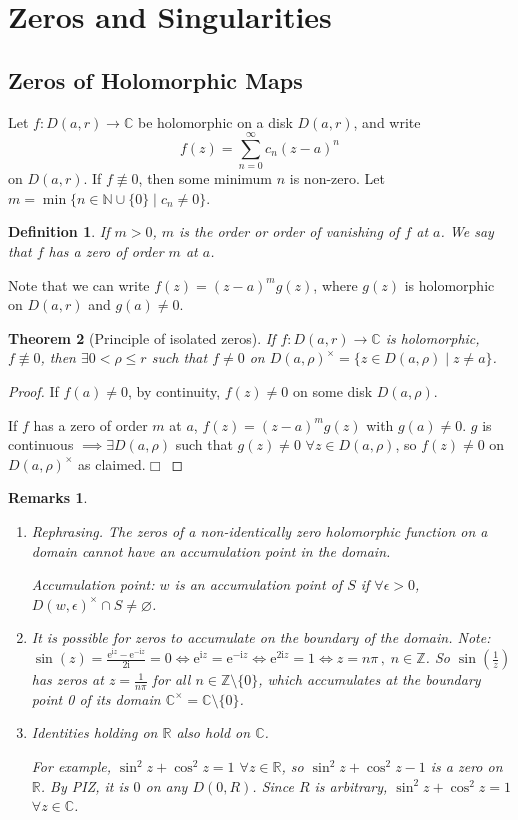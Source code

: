 \documentclass{article}
\theoremstyle{plain}\theoremheaderfont{\normalfont\itshape}\theorembodyfont{\rmfamily}\theoremseparator{.}\newtheorem*{rem}{Remark}\newtheorem*{ex}{Example}\newtheorem*{proof}{Proof}\newtheorem*{altp}{Alternative proof}\newtheorem*{con}{Consequences}\newtheorem*{notn}{Notations}\newtheorem*{cau}{Caution}\newtheorem*{term}{Terminology}\newtheorem*{keyex}{Key example}
\theoremstyle{plain}\theoremheaderfont{\normalfont\bfseries}\theorembodyfont{\rmfamily}\theoremseparator{.}\newtheorem{thm}{Theorem}[section]\newtheorem{lem}[thm]{Lemma}\newtheorem{prop}[thm]{Proposition}\newtheorem*{cor}{Corollary}\newtheorem{defn}[thm]{Definition}\newtheorem{clm}[thm]{Claim}\newtheorem{clminproof}{Claim}\newtheorem{leminproof}{Lemma}\newtheorem{app}{Application}
\theoremstyle{break}\theoremheaderfont{\normalfont\itshape}\theorembodyfont{\rmfamily}\theoremseparator{.\medskip}\newtheorem*{proofskip}{Proof}\newtheorem*{exs}{Examples}\newtheorem*{rems}{Remarks}\newtheorem*{rec}{Recall}\newtheorem*{ppts}{Properties}
\theoremstyle{break}\theoremheaderfont{\normalfont\bfseries}\theorembodyfont{\rmfamily}\theoremseparator{.\medskip}\newtheorem{lemskip}[thm]{Lemma}\newtheorem{defnskip}[thm]{Definition}\newtheorem{propskip}[thm]{Proposition}\newtheorem{thmskip}[thm]{Theorem}
\numberwithin{equation}{section}
\newcommand{\ii}{\mathrm{i}}
\newcommand{\ee}{\mathrm{e}}
\newcommand{\qed}{\hfill\ensuremath{\Box}}
\newcommand{\NN}{\mathbb{N}}
\newcommand{\ZZ}{\mathbb{Z}}
\newcommand{\RR}{\mathbb{R}}
\newcommand{\CC}{\mathbb{C}}
\begin{document}
    \section{Zeros and Singularities}
    \subsection{Zeros of Holomorphic Maps}
    Let \(f:D(a,r)\to\CC\) be holomorphic on a disk \(D(a,r)\), and write
    \[f(z)=\sum_{n=0}^{\infty}c_n(z-a)^n\]
    on \(D(a,r)\). If \(f\not\equiv 0\), then some minimum \(n\) is non-zero. Let \(m=\min\{n\in\NN\cup\{0\}\mid c_n\ne 0\}\).
    \begin{defn}
        If \(m>0\), \(m\) is the \textit{order} or \textit{order of vanishing} of \(f\) at \(a\). We say that \(f\) has a \textit{zero} of order \(m\) at \(a\).
    \end{defn}
    Note that we can write \(f(z)=(z-a)^m g(z)\), where \(g(z)\) is holomorphic on \(D(a,r)\) and \(g(a)\ne 0\).
    \begin{thm}[Principle of isolated zeros]
        If \(f:D(a,r)\to\CC\) is holomorphic, \(f\not\equiv 0\), then \(\exists 0<\rho\le r\) such that \(f\ne 0\) on \(D(a,\rho)^\times =\{z\in D(a,\rho)\mid z\ne a\}\).
    \end{thm}
    \begin{proof}
        If \(f(a)\ne 0\), by continuity, \(f(z)\ne 0\) on some disk \(D(a,\rho)\).

        If \(f\) has a zero of order \(m\) at \(a\), \(f(z)=(z-a)^m g(z)\) with \(g(a)\ne 0\). \(g\) is continuous \(\implies\exists D(a,\rho)\) such that \(g(z)\ne 0\) \(\forall z\in D(a,\rho)\), so \(f(z)\ne 0\) on \(D(a,\rho)^\times\) as claimed.\qed
    \end{proof}
    \begin{rems}
        \begin{enumerate}[topsep=0pt,label=(\roman*)]
            \item Rephrasing. The zeros of a non-identically zero holomorphic function on a domain cannot have an \textit{accumulation point} in the domain.
            
            Accumulation point: \(w\) is an \textit{accumulation point} of \(S\) if \(\forall\epsilon>0\), \(D(w,\epsilon)^\times\cap S\neq\varnothing\).
            \item It is possible for zeros to accumulate on the boundary of the domain. Note: \(\sin(z)=\frac{\ee^{\ii z}-\ee^{-\ii z}}{2\ii }=0\iff \ee^{\ii z}=\ee^{-\ii z}\iff \ee^{2\ii z}=1\iff z=n\pi\,,\;n\in\ZZ\). So \(\sin(\frac{1}{z})\) has zeros at \(z=\frac{1}{n\pi}\) for all \(n\in\ZZ\setminus\{0\}\), which accumulates at the boundary point 0 of its domain \(\CC^\times=\CC\setminus\{0\}\).
            \item Identities holding on \(\RR\) also hold on \(\CC\).
            
            For example, \(\sin^2 z+\cos^2 z=1\) \(\forall z\in\RR\), so \(\sin^2z+\cos^2 z-1\) is a zero on \(\RR\). By PIZ, it is \(0\) on any \(D(0,R)\). Since \(R\) is arbitrary, \(\sin^2 z+\cos^2 z=1\) \(\forall z\in\CC\).
        \end{enumerate}
    \end{rems}
\end{document}
